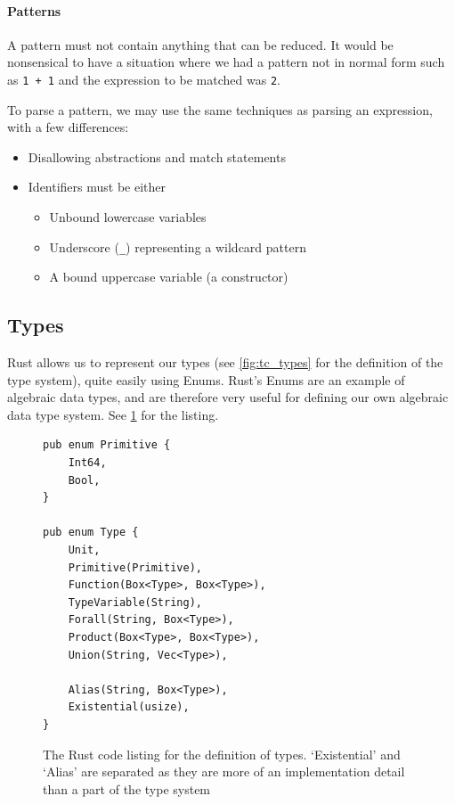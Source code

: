 \paragraph{Patterns}
\label{impl:parsing_patterns}
A pattern must not contain anything that can be reduced. It would be nonsensical to have a situation where we had a pattern not in normal form such as \verb|1 + 1| and the expression to be matched was \verb|2|. 

To parse a pattern, we may use the same techniques as parsing an expression, with a few differences:
\begin{itemize}
    \item Disallowing abstractions and match statements
    \item Identifiers must be either
    \begin{itemize}
        \item Unbound lowercase variables
        \item Underscore (\verb|_|) representing a wildcard pattern
        \item A bound uppercase variable (a constructor)
    \end{itemize}
\end{itemize}

\subsection{Types}

Rust allows us to represent our types (see \ref{fig:tc_types} for the definition of the type system), quite easily using Enums. Rust's Enums are an example of algebraic data types, and are therefore very useful for defining our own algebraic data type system. See \ref{fig:type_lst} for the listing. 

\begin{figure}[ht]
    \begin{lstlisting}[language=Rust_boxed]
pub enum Primitive {
    Int64,
    Bool,
}

pub enum Type {
    Unit,
    Primitive(Primitive),
    Function(Box<Type>, Box<Type>),
    TypeVariable(String),
    Forall(String, Box<Type>),
    Product(Box<Type>, Box<Type>),
    Union(String, Vec<Type>),

    Alias(String, Box<Type>),
    Existential(usize),
}
\end{lstlisting}
    \caption{The Rust code listing for the definition of types. `Existential' and `Alias' are separated as they are more of an implementation detail than a part of the type system}
    \label{fig:type_lst}
\end{figure}

